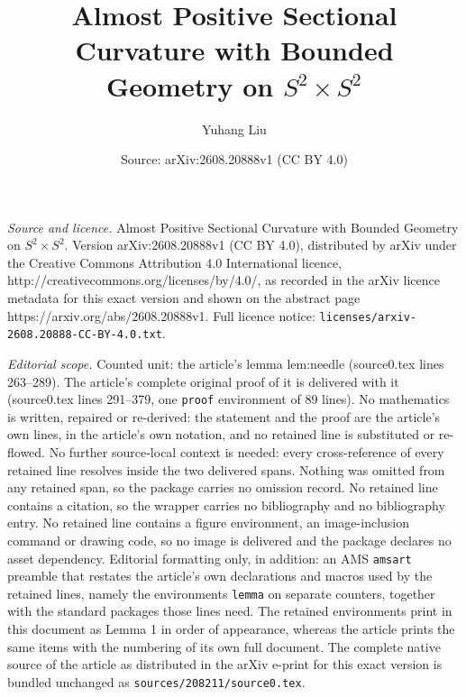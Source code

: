 \documentclass[10pt,a4paper]{amsart}
\title{Almost Positive Sectional Curvature with Bounded Geometry on $S^2\times S^2$}
\author{Yuhang Liu}
\date{Source: arXiv:2608.20888v1 (CC BY 4.0)}
\begin{document}
\maketitle

\noindent\emph{Source and licence.} Almost Positive Sectional Curvature with Bounded Geometry on $S^2\times S^2$. Version arXiv:2608.20888v1 (CC BY 4.0), distributed by arXiv under the Creative Commons Attribution 4.0 International licence, http://creativecommons.org/licenses/by/4.0/, as recorded in the arXiv licence metadata for this exact version and shown on the abstract page https://arxiv.org/abs/2608.20888v1. Full licence notice: \texttt{licenses/arxiv-2608.20888-CC-BY-4.0.txt}.\par\smallskip

\noindent\textit{Editorial scope.} Counted unit: the article's lemma lem:needle (source0.tex lines 263--289). The article's complete original proof of it is delivered with it (source0.tex lines 291--379, one \texttt{proof} environment of 89 lines). No mathematics is written, repaired or re-derived: the statement and the proof are the article's own lines, in the article's own notation, and no retained line is substituted or re-flowed.  No further source-local context is needed: every cross-reference of every retained line resolves inside the two delivered spans.  Nothing was omitted from any retained span, so the package carries no omission record.  No retained line contains a citation, so the wrapper carries no bibliography and no bibliography entry.  No retained line contains a figure environment, an image-inclusion command or drawing code, so no image is delivered and the package declares no asset dependency.  Editorial formatting only, in addition: an AMS \texttt{amsart} preamble that restates the article's own declarations and macros used by the retained lines, namely the environments \texttt{lemma} on separate counters, together with the standard packages those lines need.  The retained environments print in this document as Lemma 1 in order of appearance, whereas the article prints the same items with the numbering of its own full document.  The complete native source of the article as distributed in the arXiv e-print for this exact version is bundled unchanged as \texttt{sources/208211/source0.tex}.
\end{document}
